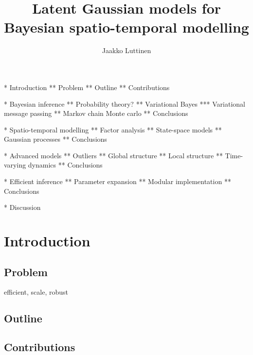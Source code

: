 \documentclass[dissertation,draft]{aaltoseries}
\author{Jaakko Luttinen}
\title{Latent Gaussian models for Bayesian spatio-temporal modelling}
\begin{document}
\draftabstract{\lipsum[1-3]}
\draftabstract[finnish]{\lipsum[4-6]}
\draftabstract[swedish]{\lipsum[7-9]}

\begin{preface}
\lipsum[1-4]
\end{preface}

\tableofcontents

\listofpublications






* Introduction
** Problem
** Outline
** Contributions

* Bayesian inference
** Probability theory?
** Variational Bayes
*** Variational message passing
** Markov chain Monte carlo
** Conclusions

* Spatio-temporal modelling
** Factor analysis
** State-space models
** Gaussian processes
** Conclusions

* Advanced models
** Outliers
** Global structure
** Local structure
** Time-varying dynamics
** Conclusions

* Efficient inference
** Parameter expansion
** Modular implementation
** Conclusions

* Discussion

\chapter{Introduction}

\section{Problem}
efficient, scale, robust

\section{Outline}

\section{Contributions}
\end{document}
